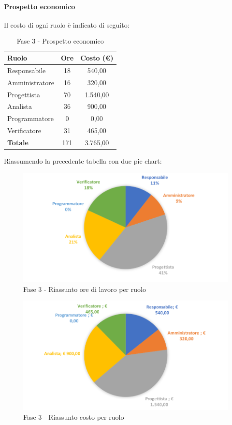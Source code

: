\documentclass[../PianoDiProgetto.tex]{subfiles}
\begin{document}
			\newpage
			\paragraph{Prospetto economico}
			Il costo di ogni ruolo è indicato di seguito:
			\begin{table}[h]
				\centering
				\begin{tabular}{l * {2}{c}}
				\toprule
				\textbf{Ruolo} & \textbf{Ore} & \textbf{Costo (\euro{})} \\
				\midrule
				Responsabile & 18 & 540,00 \\
				Amministratore & 16 & 320,00 \\
				Progettista & 70 & 1.540,00 \\
				Analista & 36 & 900,00 \\		
				Programmatore & 0 & 0,00 \\		
				Verificatore & 31 & 465,00 \\				
				\midrule		
				\textbf{Totale} & 171 & 3.765,00 \\
				\bottomrule	
				\end{tabular}
				\caption{Fase 3 - Prospetto economico}		
			\end{table}
			
			Riassumendo la precedente tabella con due pie chart:	
			\begin{figure}[!h]
				\centering
				\includegraphics[width=\textwidth]{Preventivo/Immagini/fase3_oreRuolo.png}
				\caption{Fase 3 - Riassunto ore di lavoro per ruolo}
			\end{figure}
			\newpage
			\begin{figure}[!h]
				\centering
				\includegraphics[width=\textwidth]{Preventivo/Immagini/fase3_costoRuolo.png}
				\caption{Fase 3 - Riassunto costo per ruolo}
			\end{figure}		
\end{document}
